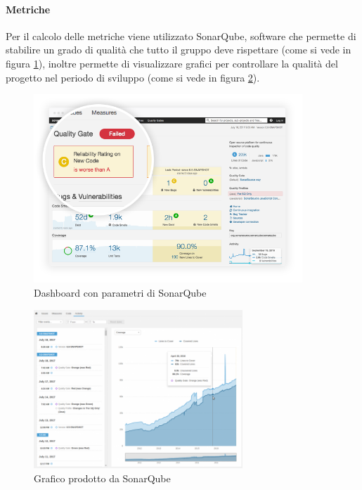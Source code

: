 			\paragraph{Metriche} \Spazio
			Per il calcolo delle metriche viene utilizzato SonarQube, software che permette di stabilire un grado di qualità che tutto il gruppo deve rispettare (come si vede in figura \ref{qualità}), inoltre permette di visualizzare grafici per controllare la qualità del progetto nel periodo di sviluppo (come si vede in figura \ref{graficobello}).
			\begin{figure}[h] 
				\centering 
				\includegraphics[width=0.9\textwidth]{images/enforce-quality-gate.png} 
				\caption{Dashboard con parametri di SonarQube}
				\label{qualità}
			\end{figure}
		    \begin{figure}[h]
		    	\centering 
		    	\includegraphics[width=0.7\textwidth]{images/project-history2.png}
		    	\caption{Grafico prodotto da SonarQube}
		    	\label{graficobello} 
		    \end{figure}
			